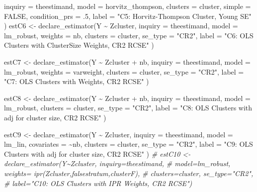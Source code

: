 \documentclass[
  12pt,
]{book}
\newenvironment{Shaded}{\begin{snugshade}}{\end{snugshade}}
\newcommand{\AttributeTok}[1]{\textcolor[rgb]{0.77,0.63,0.00}{#1}}
\newcommand{\CommentTok}[1]{\textcolor[rgb]{0.56,0.35,0.01}{\textit{#1}}}
\newcommand{\ConstantTok}[1]{\textcolor[rgb]{0.00,0.00,0.00}{#1}}
\newcommand{\DecValTok}[1]{\textcolor[rgb]{0.00,0.00,0.81}{#1}}
\newcommand{\FunctionTok}[1]{\textcolor[rgb]{0.00,0.00,0.00}{#1}}
\newcommand{\NormalTok}[1]{#1}
\newcommand{\OtherTok}[1]{\textcolor[rgb]{0.56,0.35,0.01}{#1}}
\newcommand{\SpecialCharTok}[1]{\textcolor[rgb]{0.00,0.00,0.00}{#1}}
\newcommand{\StringTok}[1]{\textcolor[rgb]{0.31,0.60,0.02}{#1}}
\theoremstyle{definition}
\theoremstyle{definition}
\theoremstyle{definition}
\theoremstyle{remark}
\begin{document}
\begin{Shaded}
\begin{Highlighting}[]
  \AttributeTok{inquiry =}\NormalTok{ theestimand, }\AttributeTok{model =}\NormalTok{ horvitz\_thompson,}
  \AttributeTok{clusters =}\NormalTok{ cluster, }\AttributeTok{simple =} \ConstantTok{FALSE}\NormalTok{, }\AttributeTok{condition\_prs =}\NormalTok{ .}\DecValTok{5}\NormalTok{, }\AttributeTok{label =} \StringTok{"C5: Horvitz{-}Thompson Cluster, Young SE"}
\NormalTok{)}
\NormalTok{estC6 }\OtherTok{\textless{}{-}} \FunctionTok{declare\_estimator}\NormalTok{(Y }\SpecialCharTok{\textasciitilde{}}\NormalTok{ Zcluster,}
  \AttributeTok{inquiry =}\NormalTok{ theestimand, }\AttributeTok{model =}\NormalTok{ lm\_robust, }\AttributeTok{weights =}\NormalTok{ nb,}
  \AttributeTok{clusters =}\NormalTok{ cluster, }\AttributeTok{se\_type =} \StringTok{"CR2"}\NormalTok{, }\AttributeTok{label =} \StringTok{"C6: OLS Clusters with ClusterSize Weights, CR2 RCSE"}
\NormalTok{)}

\NormalTok{estC7 }\OtherTok{\textless{}{-}} \FunctionTok{declare\_estimator}\NormalTok{(Y }\SpecialCharTok{\textasciitilde{}}\NormalTok{ Zcluster }\SpecialCharTok{+}\NormalTok{ nb,}
  \AttributeTok{inquiry =}\NormalTok{ theestimand,}
  \AttributeTok{model =}\NormalTok{ lm\_robust, }\AttributeTok{weights =}\NormalTok{ varweight,}
  \AttributeTok{clusters =}\NormalTok{ cluster, }\AttributeTok{se\_type =} \StringTok{"CR2"}\NormalTok{,}
  \AttributeTok{label =} \StringTok{"C7: OLS Clusters with Weights, CR2 RCSE"}
\NormalTok{)}

\NormalTok{estC8 }\OtherTok{\textless{}{-}} \FunctionTok{declare\_estimator}\NormalTok{(Y }\SpecialCharTok{\textasciitilde{}}\NormalTok{ Zcluster }\SpecialCharTok{+}\NormalTok{ nb,}
  \AttributeTok{inquiry =}\NormalTok{ theestimand,}
  \AttributeTok{model =}\NormalTok{ lm\_robust,}
  \AttributeTok{clusters =}\NormalTok{ cluster, }\AttributeTok{se\_type =} \StringTok{"CR2"}\NormalTok{,}
  \AttributeTok{label =} \StringTok{"C8: OLS Clusters with adj for cluster size, CR2 RCSE"}
\NormalTok{)}

\NormalTok{estC9 }\OtherTok{\textless{}{-}} \FunctionTok{declare\_estimator}\NormalTok{(Y }\SpecialCharTok{\textasciitilde{}}\NormalTok{ Zcluster,}
  \AttributeTok{inquiry =}\NormalTok{ theestimand,}
  \AttributeTok{model =}\NormalTok{ lm\_lin, }\AttributeTok{covariates =} \SpecialCharTok{\textasciitilde{}}\NormalTok{nb,}
  \AttributeTok{clusters =}\NormalTok{ cluster, }\AttributeTok{se\_type =} \StringTok{"CR2"}\NormalTok{,}
  \AttributeTok{label =} \StringTok{"C9: OLS Clusters with adj for cluster size, CR2 RCSE"}
\NormalTok{)}
\CommentTok{\# estC10 \textless{}{-} declare\_estimator(Y\textasciitilde{}Zcluster, inquiry=theestimand,}
\CommentTok{\#              model=lm\_robust, weights= ipr(Zcluster,falsestratum,clusterF),}
\CommentTok{\#              clusters=cluster, se\_type="CR2",}
\CommentTok{\#              label="C10: OLS Clusters with IPR Weights, CR2 RCSE")}



\end{Highlighting}
\end{Shaded}
\end{document}
